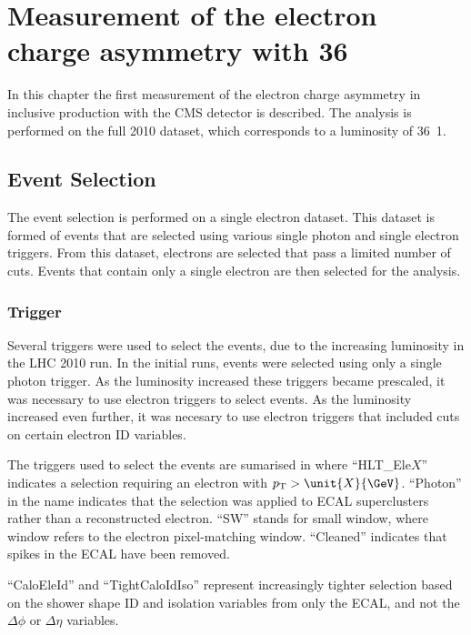 \chapter[Electron Charge Asymmetry]{ Measurement of the electron charge asymmetry with \unit{36}{\invpb} }

In this chapter the first measurement of the electron charge asymmetry in
inclusive \inclusiveWe production with the \ac{CMS} detector is described.
The analysis is performed on the full 2010 dataset, which corresponds to a
luminosity of \unit{36.1}{\invpb}.

\section{Event Selection}

The event selection is performed on a single electron dataset. This dataset is
formed of events that are selected using various single photon and single
electron triggers. From this dataset, electrons are selected that pass a limited
number of cuts. Events that contain only a single electron are then selected for
the analysis.

\subsection{Trigger}

\label{asym36:triggerdef}
Several triggers were used to select the events, due to the increasing
luminosity in the \ac{LHC} 2010 run.
In the initial runs, events were selected using only a single photon trigger. 
As the luminosity increased these triggers became prescaled, it was
necessary to use electron triggers to select events. 
As the luminosity increased even further, it was necesary to use electron
triggers that included cuts on certain electron ID variables.

The triggers used to select the events are sumarised in 
where ``HLT\_Ele$X$'' indicates a selection requiring an electron with  $\Pt > \unit{X}{\GeV}$. 
``Photon'' in the name indicates that the selection was applied to ECAL
superclusters rather than a reconstructed electron. 
``SW'' stands for small window, where window refers to the electron
pixel-matching window. 
 ``Cleaned'' indicates that spikes in the \ac{ECAL} have been removed.  

``CaloEleId'' and ``TightCaloIdIso'' represent increasingly tighter selection
based on the shower shape ID and isolation variables from only the \ac{ECAL},
and not the $\Delta\phi$ or $\Delta\eta$ variables.  

